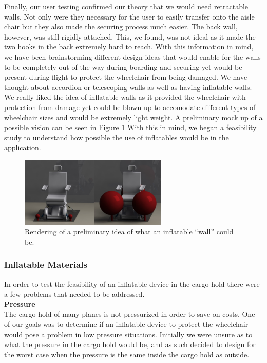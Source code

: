 Finally, our user testing confirmed our theory that we would need retractable walls. Not only were they necessary for the user to easily transfer onto the aisle chair but they also made the securing process much easier. The back wall, however, was still rigidly attached. This, we found, was not ideal as it made the two hooks in the back extremely hard to reach. With this information in mind, we have been brainstorming different design ideas that would enable for the walls to be completely out of the way during boarding and securing yet would be present during flight to protect the wheelchair from being damaged. We have thought about accordion or telescoping walls as well as having inflatable walls. We really liked the idea of inflatable walls as it provided the wheelchair with protection from damage yet could be blown up to accomodate different types of wheelchair sizes and would be extremely light weight. A preliminary mock up of a possible vision can be seen in Figure \ref{fig:inflatablesrendering.png} With this in mind, we began a feasibility study to understand how possible the use of inflatables would be in the application. 


\begin{figure}[h]
  \centering
     \includegraphics[width=7cm]{images/inflatablesrendering.png}
   \caption{Rendering of a preliminary idea of what an inflatable ``wall'' could be.}
  \label{fig:inflatablesrendering.png}
\end{figure}


\subsubsection{Inflatable Materials}

In order to test the feasibility of an inflatable device in the cargo hold there were a few problems that needed to be addressed.\\
\noindent\textbf{Pressure}\\
The cargo hold of many planes is not pressurized in order to save on costs. One of our goals was to determine if an inflatable device to protect the wheelchair would pose a problem in low pressure situations. Initially we were unsure as to what the pressure in the cargo hold would be, and as such decided to design for the worst case when the pressure is the same inside the cargo hold as outside. 

